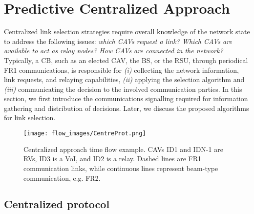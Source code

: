 \documentclass[journal]{IEEEtran}
\begin{document}
\section{Predictive Centralized Approach}\label{sec:central}

Centralized link selection strategies require overall knowledge of the network state to address the following issues: \textit{which CAVs request a link? Which CAVs are available to act as relay nodes? How CAVs are connected in the network?} 
Typically, a CB, such as an elected CAV, the BS, or the RSU, through periodical FR1 communications, is responsible for \textit{(i)} collecting the network information, link requests, and relaying capabilities, \textit{(ii)} applying the selection algorithm and \textit{(iii)} communicating the decision to the involved communication parties. 
In this section, we first introduce the communications signalling required for information gathering and distribution of decisions. Later, we discuss the proposed algorithms for link selection. 




\begin{figure} [t!]
    \centering
    \texttt{[image: flow\_images/CentreProt.png]}
    \caption{Centralized approach time flow example. CAVs ID1 and IDN-1 are RVs, ID3 is a VoI, and ID2 is a relay. Dashed lines are FR1 communication links, while continuous lines represent beam-type communication, e.g. FR2.}
    \label{fig:central}
\end{figure}

\subsection{Centralized protocol}
\end{document}
